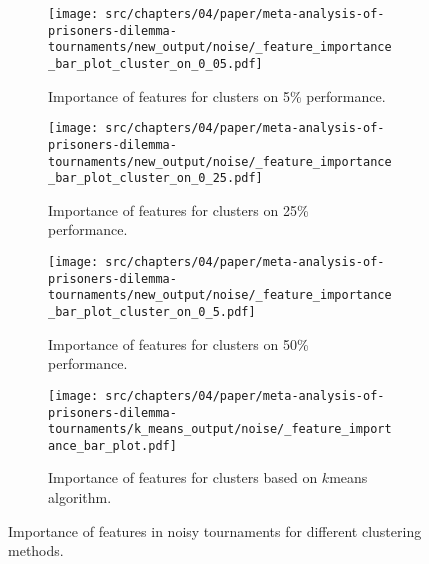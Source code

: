 \begin{figure}[!htbp]
    \begin{subfigure}{0.5\textwidth}
        \begin{center}
            \texttt{[image: src/chapters/04/paper/meta-analysis-of-prisoners-dilemma-tournaments/new\_output/noise/\_feature\_importance\_bar\_plot\_cluster\_on\_0\_05.pdf]}
        \end{center}
        \caption{Importance of features for clusters on 5\% performance.}
    \end{subfigure}\hfill
    \begin{subfigure}{0.5\textwidth}
        \begin{center}
            \texttt{[image: src/chapters/04/paper/meta-analysis-of-prisoners-dilemma-tournaments/new\_output/noise/\_feature\_importance\_bar\_plot\_cluster\_on\_0\_25.pdf]}
        \end{center}
        \caption{Importance of features for clusters on 25\% performance.}
    \end{subfigure}
    \begin{subfigure}{0.5\textwidth}
        \begin{center}
            \texttt{[image: src/chapters/04/paper/meta-analysis-of-prisoners-dilemma-tournaments/new\_output/noise/\_feature\_importance\_bar\_plot\_cluster\_on\_0\_5.pdf]}
        \end{center}
        \caption{Importance of features for clusters on 50\% performance.}
    \end{subfigure}\hfill
    \begin{subfigure}{0.5\textwidth}
        \begin{center}
            \texttt{[image: src/chapters/04/paper/meta-analysis-of-prisoners-dilemma-tournaments/k\_means\_output/noise/\_feature\_importance\_bar\_plot.pdf]}
        \end{center}
        \caption{Importance of features for clusters based on \(k\)means algorithm.}
    \end{subfigure}
    \caption{Importance of features in noisy tournaments for different
    clustering methods.}\label{fig:clustering_importance_noise}
\end{figure}

